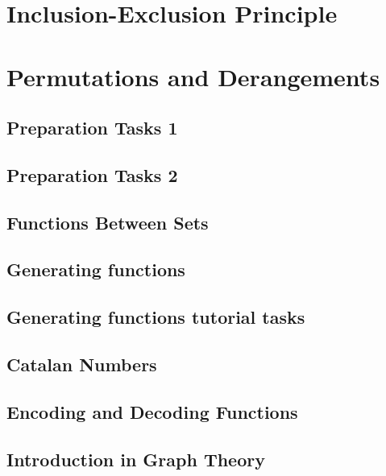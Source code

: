 \documentclass{article}
\newcommand{\includelectureSub}[1]{%
  \begingroup
    \renewcommand{\section}{\subsection}%
  \endgroup
}
\newcommand{\includelectureNoHeader}[1]{%
  \begingroup
    \let\maketitle\relax%
  \endgroup
}
\begin{document}
\section{Inclusion-Exclusion Principle}
\includelectureNoHeader{Inclusion_Exclusion}

\section{Permutations and Derangements}
\includelectureSub{Permutations_Derangements}

\section{Preparation Tasks 1}
\includelectureSub{Preparation_tasks1}

\section{Preparation Tasks 2}
\includelectureSub{Preparation_tasks2}

\section{Functions Between Sets}
\includelectureNoHeader{Functions_between_sets}

\section{Generating functions}
\includelectureSub{Generating_functions}

\section{Generating functions tutorial tasks}
\includelectureSub{Generating_functions_tutorial}

\section{Catalan Numbers}
\includelectureSub{Catalan_Numbers}

\section{Encoding and Decoding Functions}
\includelectureSub{Codes}

\section{Introduction in Graph Theory}
\includelectureSub{Graphs}
\end{document}
